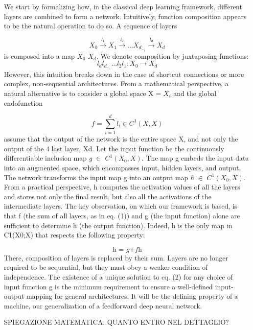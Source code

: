 \documentclass{article}
\begin{document}
We start by formalizing how, in the classical deep learning framework, different layers are combined to form a network. Intuitively, function composition
appears to be the natural operation to do so. A sequence of layers

\[X_0 \xrightarrow{l_1} X_1 \xrightarrow{l_2}... X_d_-_1 \xrightarrow{l_d} X_d\]
\noindent
is composed into a map $X_0$ \rightarrow $X_d$. 
We denote composition by juxtaposing
functions:
\[l_d l_d_-_1 ... l_2 l_1:X_0\rightarrow X_d \]
However, this intuition breaks down in the case of shortcut connections or more
complex, non-sequential architectures.
From a mathematical perspective, a natural alternative is to consider a global
space X = \bigoplus $X_i$
and the global endofunction




\begin{equation}
\textit{f}= \sum_{i=1}^{d} l_i \in C^{1} (X,X)
\end{equation}
assume that the output of the network is the entire space X, and not only the output of the
4
last layer, Xd. Let the input function be the continuously differentiable inclusion
map \textit{g} $ \in $  $C^{1} (X_0,X)$. The map g embeds the input data into an augmented
space, which encompasses input, hidden layers, and output. The network transforms the input map g into an output map \textit{h} $ \in $  $C^{1} (X_0,X)$. From a practical
perspective, h computes the activation values of all the layers and stores not
only the final result, but also all the activations of the intermediate layers.
The key observation, on which our framework is based, is that f (the sum of
all layers, as in eq. (1)) and g (the input function) alone are sufficient to determine
h (the output function). Indeed, h is the only map in C1(X0;X) that respects
the following property:

\begin{equation}
\textit{h = g+fh}
\end{equation}
\noindent
There, composition of layers is replaced by their sum. Layers
are no longer required to be sequential, but they must obey a weaker condition of independence.
The existence of a unique solution to eq. (2) for any choice of input function g is the minimum requirement to ensure a well-defined input-output mapping for general architectures.
It will be the defining property of a machine, our generalization of a feedforward deep neural network.

SPIEGAZIONE MATEMATICA: QUANTO ENTRO NEL DETTAGLIO?
\end{document}
